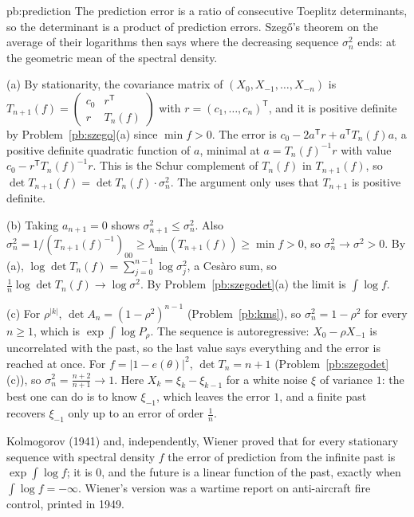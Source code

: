 \begin{solution}{pb:prediction}
\idea The prediction error is a ratio of consecutive Toeplitz determinants, so the determinant is a product of prediction errors. Szegő's theorem on the average of their logarithms then says where
the decreasing sequence $\sigma_n^2$ ends: at the geometric mean of the spectral density.

\writeup (a) By stationarity, the covariance matrix of $(X_0,X_{-1},\dots,X_{-n})$ is $T_{n+1}(f)=\begin{pmatrix}c_0&r^{\mathsf T}\\r&T_n(f)\end{pmatrix}$ with $r=(c_1,\dots,c_n)^{\mathsf T}$, and it is positive definite
by Problem~\ref{pb:szego}(a) since $\min f>0$. The error is $c_0-2a^{\mathsf T}r+a^{\mathsf T}T_n(f)a$, a positive definite quadratic function of $a$, minimal at $a=T_n(f)^{-1}r$ with value $c_0-r^{\mathsf T}T_n(f)^{-1}r$.
This is the Schur complement of $T_n(f)$ in $T_{n+1}(f)$, so $\det T_{n+1}(f)=\det T_n(f)\cdot\sigma_n^2$. The argument only uses that $T_{n+1}$ is positive definite.

(b) Taking $a_{n+1}=0$ shows $\sigma_{n+1}^2\le\sigma_n^2$. Also $\sigma_n^2=1/(T_{n+1}(f)^{-1})_{00}\ge\lambda_{\min}(T_{n+1}(f))\ge\min f>0$, so $\sigma_n^2\to\sigma^2>0$. By (a),
$\log\det T_n(f)=\sum_{j=0}^{n-1}\log\sigma_j^2$, a Cesàro sum, so $\frac1n\log\det T_n(f)\to\log\sigma^2$. By Problem~\ref{pb:szegodet}(a) the limit is $\int\log f$.

(c) For $\rho^{|k|}$, $\det A_n=(1-\rho^2)^{n-1}$ (Problem~\ref{pb:kms}), so $\sigma_n^2=1-\rho^2$ for every $n\ge1$, which is $\exp\int\log P_\rho$. The sequence is autoregressive: $X_0-\rho X_{-1}$ is
uncorrelated with the past, so the last value says everything and the error is reached at once. For $f=|1-e(\theta)|^2$, $\det T_n=n+1$ (Problem~\ref{pb:szegodet}(c)), so $\sigma_n^2=\frac{n+2}{n+1}\to1$.
Here $X_k=\xi_k-\xi_{k-1}$ for a white noise $\xi$ of variance $1$: the best one can do is to know $\xi_{-1}$, which leaves the error $1$, and a finite past recovers $\xi_{-1}$ only up to an error of
order $\frac1n$.

\leads Kolmogorov (1941) and, independently, Wiener proved that for every stationary sequence with spectral density $f$ the error of prediction from the infinite past is $\exp\int\log f$; it is $0$,
and the future is a linear function of the past, exactly when $\int\log f=-\infty$. Wiener's version was a wartime report on anti-aircraft fire control, printed in 1949.
\end{solution}

